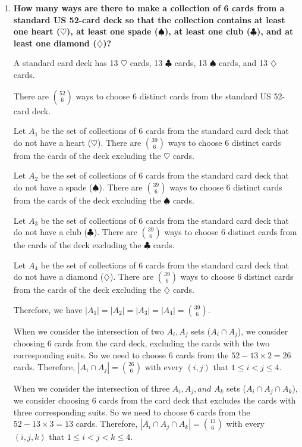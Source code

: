 \documentclass[10pt]{article}
\begin{document}
\begin{enumerate}
Therefore, the number of  ways we can arrange the 26 letters of the alphabet so that no two vowels (AEIOU) appear consecutively is $21! \times \frac{22!}{17!}$.

 pt

\item
\textbf{How many ways are there to make a collection of 6 cards from a standard US 52-card deck so that the collection contains at least one heart ($\heartsuit$), at least one spade ($\spadesuit$), at least one club ($\clubsuit$), and at least one diamond ($\diamondsuit$)?}

A standard card deck has 13 $\heartsuit$ cards, 13 $\clubsuit$ cards, 13 $\spadesuit$ cards, and 13 $\diamondsuit$ cards.

There are $\binom{52}{6}$ ways to choose 6 distinct cards from the standard US 52-card deck. 

Let $A_1$ be the set of collections of 6 cards from the standard card deck that do not have a heart ($\heartsuit$). There are $\binom{39}{6}$ ways to choose 6 distinct cards from the cards of the deck excluding the $\heartsuit$ cards.  

Let $A_2$ be the set of collections of 6 cards from the standard card deck that do not have a spade ($\spadesuit$). There are $\binom{39}{6}$ ways to choose 6 distinct cards from the cards of the deck excluding the $\spadesuit$ cards. 

Let $A_3$ be the set of collections of 6 cards from the standard card deck that do not have a club ($\clubsuit$). There are $\binom{39}{6}$ ways to choose 6 distinct cards from the cards of the deck excluding the $\clubsuit$ cards. 

Let $A_4$ be the set of collections of 6 cards from the standard card deck that do not have a diamond ($\diamondsuit$). There are $\binom{39}{6}$ ways to choose 6 distinct cards from the cards of the deck excluding the $\diamondsuit$ cards. 

Therefore, we have $|A_1| =|A_2| =|A_3|=|A_4|=\binom{39}{6}$. 

When we consider the intersection of two $A_i, A_j$ sets ($A_i \cap A_j$), we consider choosing 6 cards from the card deck, excluding the cards with the two corresponding suits. So we need to choose 6 cards from the $52 - 13 \times 2 = 26$ cards. Therefore, $|A_i \cap A_j| = \binom{26}{6}$ with every $(i,j)$ that $1 \leq i < j \leq 4$.

When we consider the intersection of three $A_i, A_j, \textit{and } A_k$ sets ($A_i \cap A_j \cap A_k$), we consider choosing 6 cards from the card deck that  excludes the cards with three corresponding suits. So we need to choose 6 cards from the $52 - 13 \times 3 = 13$ cards. Therefore, $|A_i \cap A_j \cap A_k| = \binom{13}{6}$ with every $(i,j, k)$ that $1 \leq i < j < k \leq 4$.


\end{enumerate}
\end{document}
